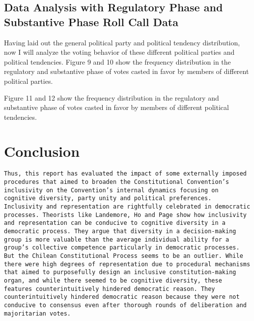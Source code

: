 \documentclass[
  man]{apa6}
\begin{document}
\hypertarget{data-analysis-with-regulatory-phase-and-substantive-phase-roll-call-data}{%
\subsection{Data Analysis with Regulatory Phase and Substantive Phase Roll Call Data}\label{data-analysis-with-regulatory-phase-and-substantive-phase-roll-call-data}}

Having laid out the general political party and political tendency distribution, now I will analyze the voting behavior of these different political parties and political tendencies.
Figure 9 and 10 show the frequency distribution in the regulatory and substantive phase of votes casted in favor by members of different political parties.

Figure 11 and 12 show the frequency distribution in the regulatory and substantive phase of votes casted in favor by members of different political tendencies.

\hypertarget{conclusion}{%
\section{Conclusion}\label{conclusion}}

\begin{verbatim}
Thus, this report has evaluated the impact of some externally imposed procedures that aimed to broaden the Constitutional Convention’s inclusivity on the Convention’s internal dynamics focusing on cognitive diversity, party unity and political preferences. Inclusivity and representation are rightfully celebrated in democratic processes. Theorists like Landemore, Ho and Page show how inclusivity and representation can be conducive to cognitive diversity in a democratic process. They argue that diversity in a decision-making group is more valuable than the average individual ability for a group’s collective competence particularly in democratic processes. But the Chilean Constitutional Process seems to be an outlier. While there were high degrees of representation due to procedural mechanisms that aimed to purposefully design an inclusive constitution-making organ, and while there seemed to be cognitive diversity, these features counterintuitively hindered democratic reason. They counterintuitively hindered democratic reason because they were not conducive to consensus even after thorough rounds of deliberation and majoritarian votes. 
\end{verbatim}
\end{document}
